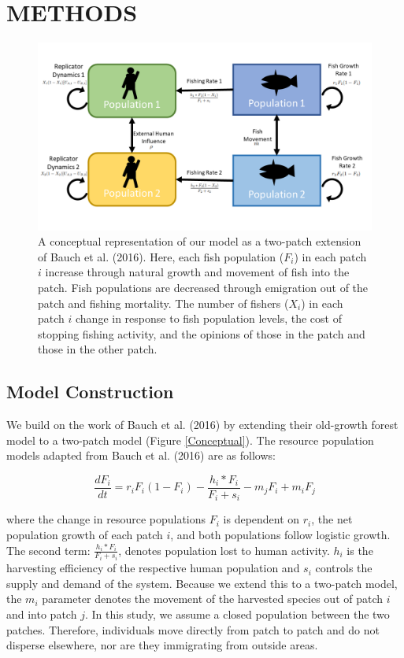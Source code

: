 \documentclass[
  12pt,
]{article}
\begin{document}
\hypertarget{methods}{%
\section{METHODS}\label{methods}}

\begin{figure}
\includegraphics[width=1\linewidth]{CoupledModelConceptual} \caption{A conceptual representation of our model as a two-patch extension of Bauch et al. (2016). Here, each fish population (\(F_i\)) in each patch \(i\) increase through natural growth and movement of fish into the patch. Fish populations are decreased through emigration out of the patch and fishing mortality. The number of fishers (\(X_i\)) in each patch \(i\) change in response to fish population levels, the cost of stopping fishing activity, and the opinions of those in the patch and those in the other patch. \label{Conceptual}}\label{fig:Conceptual}
\end{figure}



\hypertarget{model-construction}{%
\subsection{Model Construction}\label{model-construction}}

We build on the work of Bauch et al. (2016) by extending their old-growth forest model to a two-patch model (Figure \ref{Conceptual}). The resource population models adapted from Bauch et al. (2016) are as follows:

\begin{equation} 
  \frac{dF_i}{dt} = r_iF_i(1-F_i)-\frac{h_i*F_i}{F_i + s_i} - m_jF_i + m_iF_j
  \label{eq:fish1}
\end{equation}

where the change in resource populations \(F_i\) is dependent on \(r_i\), the net population growth of each patch \(i\), and both populations follow logistic growth. The second term: \(\frac{h_i*F_i}{F_i + s_i}\), denotes population lost to human activity. \(h_i\) is the harvesting efficiency of the respective human population and \(s_i\) controls the supply and demand of the system. Because we extend this to a two-patch model, the \(m_i\) parameter denotes the movement of the harvested species out of patch \(i\) and into patch \(j\). In this study, we assume a closed population between the two patches. Therefore, individuals move directly from patch to patch and do not disperse elsewhere, nor are they immigrating from outside areas.
\end{document}
